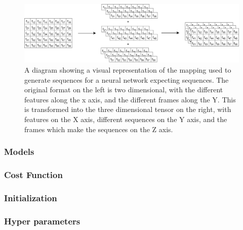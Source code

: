 \documentclass[a4paper,11pt,notitlepage]{article}
\begin{document}
\begin{figure}[H]
	\centering
	\vspace{0.5cm}
	\includegraphics[scale = 0.15]{diagrams/sequence_generation.png}
	\caption{A diagram showing a visual representation of the mapping used to generate sequences for a neural network expecting sequences. The original format on the left is two dimensional, with the different features along the x axis, and the different frames along the Y. This is transformed into the three dimensional tensor on the right, with features on the X axis, different sequences on the Y axis, and the frames which make the sequences on the Z axis.}
	\label{sequence_generation_mapping}
\end{figure}

\subsubsection{Models}



\subsubsection{Cost Function}


\subsubsection{Initialization}


\subsubsection{Hyper parameters}
\end{document}
